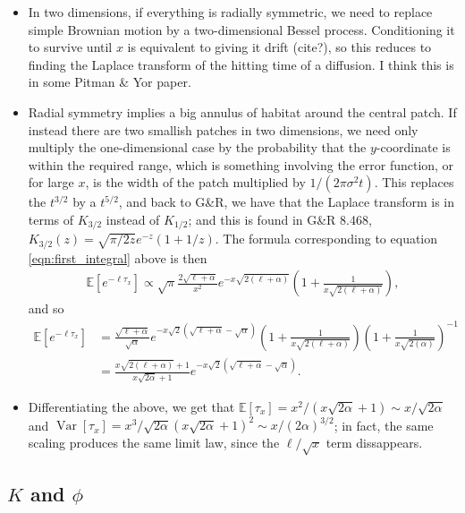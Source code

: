 \documentclass{article}
\newcommand{\E}{\mathbb{E}}
\newcommand{\var}{\mathop{\mbox{Var}}}
\begin{document}
\begin{itemize}

\item In two dimensions, if everything is radially symmetric, we need to replace simple Brownian motion by a two-dimensional Bessel process.
Conditioning it to survive until $x$ is equivalent to giving it drift (cite?),
so this reduces to finding the Laplace transform of the hitting time of a diffusion.
I think this is in some Pitman \& Yor paper.

\item Radial symmetry implies a big annulus of habitat around the central patch.
If instead there are two smallish patches in two dimensions, 
we need only multiply the one-dimensional case by the probability that the $y$-coordinate is within the required range,
which is something involving the error function, or for large $x$,
is the width of the patch multiplied by $1/(2 \pi \sigma^2 t)$.  
This replaces the $t^{3/2}$ by a $t^{5/2}$, and back to G\&R, we have that the Laplace transform is in terms of $K_{3/2}$ instead of $K_{1/2}$;
and this is found in G\&R 8.468, $K_{3/2}(z) = \sqrt{\pi/2z} e^{-z} (1+1/z)$.
The formula corresponding to equation \eqref{eqn:first_integral} above is then
\begin{align}
  \E[e^{-\ell \tau_x}] \propto \sqrt{\pi} \frac{2\sqrt{\ell+\alpha}}{x^2} e^{-x\sqrt{2(\ell+\alpha)}} \left( 1 + \frac{1}{x\sqrt{2(\ell+\alpha)}} \right) ,
\end{align}
and so
\begin{align}
  \E[e^{-\ell \tau_x}] &= \frac{\sqrt{\ell+\alpha}}{\sqrt{\alpha}} e^{-x\sqrt{2}\left(\sqrt{\ell+\alpha}-\sqrt{\alpha}\right)} \left( 1 + \frac{1}{x\sqrt{2(\ell+\alpha)}} \right) \left( 1 + \frac{1}{x\sqrt{2(\alpha)}} \right)^{-1} \\
  &= \frac{x\sqrt{2(\ell+\alpha)}+1}{x\sqrt{2\alpha}+1} e^{-x\sqrt{2}\left(\sqrt{\ell+\alpha}-\sqrt{\alpha}\right)} .
\end{align}

\item Differentiating the above, we get that $\E[\tau_x] = x^2 / (x\sqrt{2\alpha}+1) \sim x/\sqrt{2\alpha}$ and $\var[\tau_x] = x^3 / \sqrt{2\alpha}(x\sqrt{2\alpha}+1)^2 \sim x/(2\alpha)^{3/2}$; in fact, the same scaling produces the same limit law, since the $\ell/\sqrt{x}$ term dissappears.

\end{itemize}



\subsection{$K$ and $\phi$}
\end{document}
